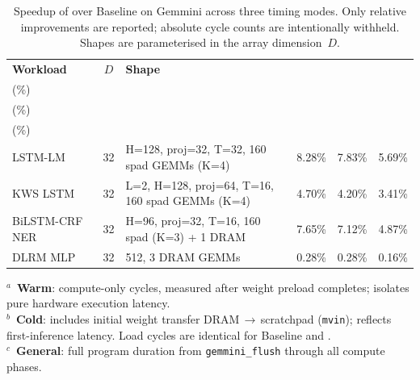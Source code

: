 \begin{table}[t]
\centering
\caption{Speedup of \pipette{} over Baseline on Gemmini across three timing modes. Only relative improvements are reported; absolute cycle counts are intentionally withheld. Shapes are parameterised in the array dimension~$D$.}
\label{tab:benchmark_results}
\small
\setlength{\tabcolsep}{5pt}
\renewcommand{\arraystretch}{1.15}
\begin{tabular}{@{} l c l rrr @{}}
\toprule
\textbf{Workload} & \textbf{$D$} & \textbf{Shape} & \shortstack{Warm$^{a}$\\(\%)} & \shortstack{Cold$^{b}$\\(\%)} & \shortstack{General$^{c}$\\(\%)} \\
\midrule
LSTM-LM~\cite{sak_long_2014} & 32 & H=128, proj=32, T=32, 160 spad GEMMs (K=4) & 8.28\% & 7.83\% & 5.69\% \\
KWS LSTM~\cite{arik_convolutional_2017} & 32 & L=2, H=128, proj=64, T=16, 160 spad GEMMs (K=4) & 4.70\% & 4.20\% & 3.41\% \\
BiLSTM-CRF NER~\cite{lample_neural_2016} & 32 & H=96, proj=32, T=16, 160 spad (K=3) + 1 DRAM & 7.65\% & 7.12\% & 4.87\% \\
DLRM MLP~\cite{naumov_deep_2019} & 32 & 512\textrightarrow 256\textrightarrow 64\textrightarrow 32, 3 DRAM GEMMs & 0.28\% & 0.28\% & 0.16\% \\
\bottomrule
\end{tabular}
\par\smallskip
\begin{minipage}{\linewidth}
\footnotesize
$^{a}$~\textbf{Warm}: compute-only cycles, measured after weight preload completes; isolates pure hardware execution latency.\quad \\
$^{b}$~\textbf{Cold}: includes initial weight transfer DRAM\,$\to$\,scratchpad (\texttt{mvin}); reflects first-inference latency. Load cycles are identical for Baseline and \pipette{}.\quad \\
$^{c}$~\textbf{General}: full program duration from \texttt{gemmini\_flush} through all compute phases.
\end{minipage}
\end{table}
